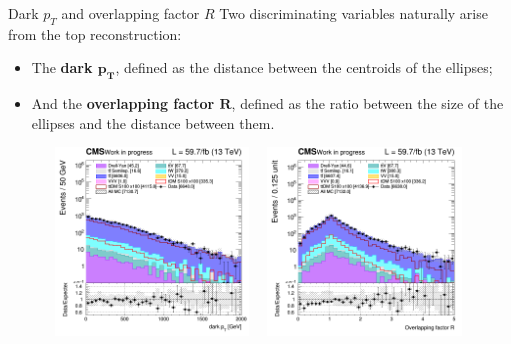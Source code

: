\documentclass[8pt]{beamer}
\begin{document}
\begin{frame}{Dark $p_T$ and overlapping factor $R$}
\justifying
Two discriminating variables naturally arise from the top reconstruction:
\begin{itemize}
\item The \textbf{dark $\bm{p_T}$}, defined as the distance between the centroids of the ellipses;
\item And the \textbf{overlapping factor $\bm{R}$}, defined as the ratio between the size of the ellipses and the distance between them. 
\end{itemize} \vfill

\begin{figure}[htbp]
\centering
\begin{minipage}[b]{.49\textwidth}
\includegraphics[width=5.5cm, height=5cm]{figs/2018/SmearSR-ttDM-scalar100/log_cratio_topCR_ll_dark_pt.png}
\end{minipage}\hfill
\begin{minipage}[b]{.49\textwidth}
\includegraphics[width=5.5cm, height=5cm]{figs/2018/SmearSR-ttDM-scalar100/log_cratio_topCR_ll_overlapping_factor.png}
\end{minipage} \hfill
\label{fig:SRdiscmblt}
\end{figure}
\end{frame}
\end{document}

